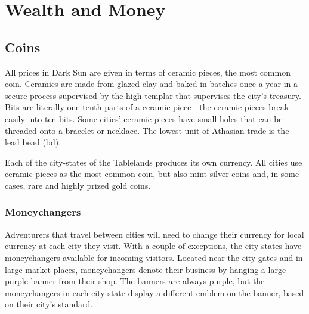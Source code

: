 \section{Wealth and Money}
\subsection{Coins}
All prices in {\tableheader Dark Sun} are given in terms of ceramic pieces, the most common coin. Ceramics are made from glazed clay and baked in batches once a year in a secure process supervised by the high templar that supervises the city's treasury. Bits are literally one-tenth parts of a ceramic piece---the ceramic pieces break easily into ten bits. Some cities' ceramic pieces have small holes that can be threaded onto a bracelet or necklace. The lowest unit of Athasian trade is the lead bead (bd).

Each of the city-states of the Tablelands produces its own currency. All cities use ceramic pieces as the most common coin, but also mint silver coins and, in some cases, rare and highly prized gold coins.


\subsubsection{Moneychangers}
Adventurers that travel between cities will need to change their currency for local currency at each city they visit. With a couple of exceptions, the city-states have moneychangers available for incoming visitors. Located near the city gates and in large market places, moneychangers denote their business by hanging a large purple banner from their shop. The banners are always purple, but the moneychangers in each city-state display a different emblem on the banner, based on their city's standard.

